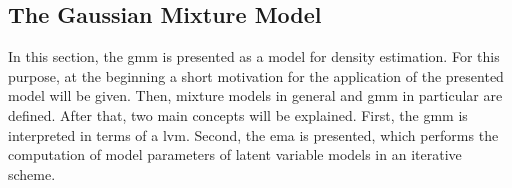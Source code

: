 \documentclass[../../../main.tex]{subfiles}
\begin{document}
\subsection{The Gaussian Mixture Model} \label{subsec:gaussian_mixture_model}

In this section, the \acrshort{gmm} is presented as a model for density estimation. For this purpose, at the beginning a short motivation for the application of the presented model will be given. Then, mixture models in general and \acrshort{gmm} in particular are defined. After that, two main concepts will be explained. First, the \acrshort{gmm} is interpreted in terms of a \acrshort{lvm}. Second, the \acrshort{ema} is presented, which performs the computation of model parameters of latent variable models in an iterative scheme.


\end{document}
